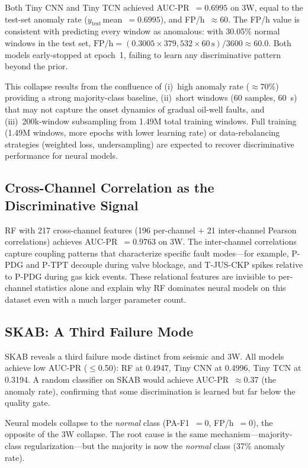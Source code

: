 \documentclass[conference]{IEEEtran}
\begin{document}
Both Tiny CNN and Tiny TCN achieved AUC-PR~$=0.6995$ on 3W, equal to the
test-set anomaly rate ($y_{\text{test}}$\,mean~$=0.6995$), and FP/h~$\approx60$.
The FP/h value is consistent with predicting every window as anomalous:
with 30.05\% normal windows in the test set,
$\text{FP/h} = (0.3005 \times 379{,}532 \times 60\,\text{s}) / 3600 \approx 60.0$.
Both models early-stopped at epoch~1, failing to learn any discriminative
pattern beyond the prior.

This collapse results from the confluence of (i)~high anomaly rate
($\approx70\%$) providing a strong majority-class baseline, (ii)~short
windows (60 samples, 60~s) that may not capture the onset dynamics of
gradual oil-well faults, and (iii)~200k-window subsampling from 1.49M total
training windows.
Full training (1.49M windows, more epochs with lower learning rate) or
data-rebalancing strategies (weighted loss, undersampling) are expected to
recover discriminative performance for neural models.

\subsection{Cross-Channel Correlation as the Discriminative Signal}

RF with 217 cross-channel features (196 per-channel + 21 inter-channel
Pearson correlations) achieves AUC-PR~$=0.9763$ on 3W.
The inter-channel correlations capture coupling patterns that characterize
specific fault modes---for example, P-PDG and P-TPT decouple during valve
blockage, and T-JUS-CKP spikes relative to P-PDG during gas kick events.
These relational features are invisible to per-channel statistics alone and
explain why RF dominates neural models on this dataset even with a much larger
parameter count.

\subsection{SKAB: A Third Failure Mode}

SKAB reveals a third failure mode distinct from seismic and 3W.
All models achieve low AUC-PR ($\leq$0.50): RF at 0.4947, Tiny CNN at 0.4996,
Tiny TCN at 0.3194.
A random classifier on SKAB would achieve AUC-PR~$\approx$0.37 (the anomaly
rate), confirming that some discrimination is learned but far below the quality gate.

Neural models collapse to the \emph{normal} class (PA-F1~$=0$, FP/h~$=0$),
the opposite of the 3W collapse.
The root cause is the same mechanism---majority-class regularization---but
the majority is now the \emph{normal} class (37\% anomaly rate).
\end{document}
